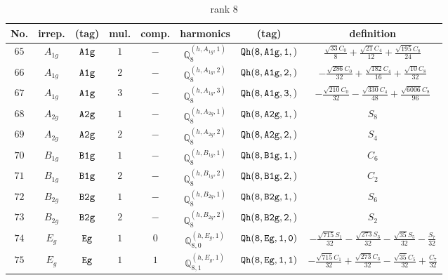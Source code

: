\documentclass[fleqn,8pt]{jsarticle}
\begin{document}
\begin{table}[ht!]
\begin{center}
\caption{rank 8}
\renewcommand{\arraystretch}{1.3}
\begin{tabular}{cccccccc} \hline \hline
No. & irrep. & (tag) & mul. & comp. & harmonics & (tag) & definition \\ \hline
$ 65 $ & $ A_{1g} $ & $ {\tt A1g} $ & $ 1 $ & $ - $ & $ \mathbb{Q}_{8}^{(h,A_{1g},1)} $ & $ {\tt Qh(8,A1g,1,)} $ & $ \frac{\sqrt{33} C_{0}}{8} + \frac{\sqrt{21} C_{4}}{12} + \frac{\sqrt{195} C_{8}}{24} $ \\
$ 66 $ & $ A_{1g} $ & $ {\tt A1g} $ & $ 2 $ & $ - $ & $ \mathbb{Q}_{8}^{(h,A_{1g},2)} $ & $ {\tt Qh(8,A1g,2,)} $ & $ - \frac{\sqrt{286} C_{0}}{32} + \frac{\sqrt{182} C_{4}}{16} + \frac{\sqrt{10} C_{8}}{32} $ \\
$ 67 $ & $ A_{1g} $ & $ {\tt A1g} $ & $ 3 $ & $ - $ & $ \mathbb{Q}_{8}^{(h,A_{1g},3)} $ & $ {\tt Qh(8,A1g,3,)} $ & $ - \frac{\sqrt{210} C_{0}}{32} - \frac{\sqrt{330} C_{4}}{48} + \frac{\sqrt{6006} C_{8}}{96} $ \\
$ 68 $ & $ A_{2g} $ & $ {\tt A2g} $ & $ 1 $ & $ - $ & $ \mathbb{Q}_{8}^{(h,A_{2g},1)} $ & $ {\tt Qh(8,A2g,1,)} $ & $ S_{8} $ \\
$ 69 $ & $ A_{2g} $ & $ {\tt A2g} $ & $ 2 $ & $ - $ & $ \mathbb{Q}_{8}^{(h,A_{2g},2)} $ & $ {\tt Qh(8,A2g,2,)} $ & $ S_{4} $ \\
$ 70 $ & $ B_{1g} $ & $ {\tt B1g} $ & $ 1 $ & $ - $ & $ \mathbb{Q}_{8}^{(h,B_{1g},1)} $ & $ {\tt Qh(8,B1g,1,)} $ & $ C_{6} $ \\
$ 71 $ & $ B_{1g} $ & $ {\tt B1g} $ & $ 2 $ & $ - $ & $ \mathbb{Q}_{8}^{(h,B_{1g},2)} $ & $ {\tt Qh(8,B1g,2,)} $ & $ C_{2} $ \\
$ 72 $ & $ B_{2g} $ & $ {\tt B2g} $ & $ 1 $ & $ - $ & $ \mathbb{Q}_{8}^{(h,B_{2g},1)} $ & $ {\tt Qh(8,B2g,1,)} $ & $ S_{6} $ \\
$ 73 $ & $ B_{2g} $ & $ {\tt B2g} $ & $ 2 $ & $ - $ & $ \mathbb{Q}_{8}^{(h,B_{2g},2)} $ & $ {\tt Qh(8,B2g,2,)} $ & $ S_{2} $ \\
$ 74 $ & $ E_{g} $ & $ {\tt Eg} $ & $ 1 $ & $ 0 $ & $ \mathbb{Q}_{8,0}^{(h,E_{g},1)} $ & $ {\tt Qh(8,Eg,1,0)} $ & $ - \frac{\sqrt{715} S_{1}}{32} - \frac{\sqrt{273} S_{3}}{32} - \frac{\sqrt{35} S_{5}}{32} - \frac{S_{7}}{32} $ \\
$ 75 $ & $ E_{g} $ & $ {\tt Eg} $ & $ 1 $ & $ 1 $ & $ \mathbb{Q}_{8,1}^{(h,E_{g},1)} $ & $ {\tt Qh(8,Eg,1,1)} $ & $ - \frac{\sqrt{715} C_{1}}{32} + \frac{\sqrt{273} C_{3}}{32} - \frac{\sqrt{35} C_{5}}{32} + \frac{C_{7}}{32} $ \\

\end{tabular}
\end{center}
\end{table}
\end{document}
